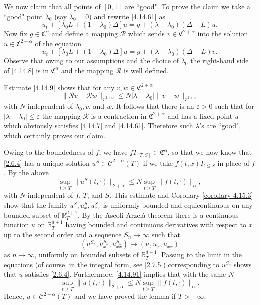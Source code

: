 \documentclass[reqno,12pt]{amsart}
\theoremstyle{definition}
\theoremstyle{remark}
\begin{document}
We now claim that all points of $[0,1]$ are ``good". To prove the
claim we take a ``good" point $\lambda_{0}$ (say $\lambda_{0}=0$)
and rewrite \eqref{4.14.61} as
\begin{equation}
                                                       \label{4.14.7}
u_{t}+[\lambda_{0} L+(1-\lambda_{0})\Delta] u=g
+(\lambda-\lambda_{0})(\Delta-L)u.
\end{equation}
Now fix $g\in {\mathfrak{C}}^{\alpha}$ and define a mapping ${\mathcal{R}}$ which sends
$v\in
{\mathfrak{C}}^{2+\alpha}$ into the solution $u\in {\mathfrak{C}}^{2+\alpha}$ of the
equation
\begin{equation}
                                                       \label{4.14.8}
u_{t}+[\lambda_{0} L+(1-\lambda_{0})\Delta] u=g
+(\lambda-\lambda_{0})(\Delta-L)v.
\end{equation}
Observe that owing to our assumptions and the choice of
$\lambda_{0}$ the right-hand side of \eqref{4.14.8} is in
${\mathfrak{C}}^{\alpha}$ and the mapping ${\mathcal{R}}$ is well defined.

Estimate \eqref{4.14.9} shows that for any $v,w\in{\mathfrak{C}}^{2+\alpha}$
$$
\|{\mathcal{R}} v-{\mathcal{R}} w\|_{{\mathfrak{C}}^{2+\alpha}}\leq N|\lambda-\lambda_{0}| \| v-
w\|_{{\mathfrak{C}}^{2+\alpha}}
$$
with $N$ independent of $\lambda_{0},v$, and $w$. It follows that
there is an $\varepsilon>0$ such that for
$|\lambda-\lambda_{0}|\leq\varepsilon$ the mapping ${\mathcal{R}}$ is a
contraction in ${\mathfrak{C}}^{2+\alpha}$ and has a fixed point $u$ which
obviously satisfies \eqref{4.14.7} and \eqref{4.14.61}. Therefore
such $\lambda$'s are ``good", which certainly proves our claim.

Owing to the boundedness of $f$, we have $fI_{[T,S]}\in
{\mathfrak{C}}^{\alpha}$, so that we now know that \eqref{2.6.4} has a
unique solution $u^{S} \in {\mathcal{C}}^{2+\alpha}(T)$ if we take
$f(t,x)I_{t\le S}$ in place of $f$. By the above
\begin{equation}
                                                       \label{4.14.91}
\sup_{t\geq T}\|u^{S}(t, \cdot )\|_{2+\alpha}  \leq N\sup_{t\geq
T}\|f(t,\cdot)\|_{\alpha},
\end{equation}
   with $N$ independent of $f$, $T$, and $S$. This estimate  and
Corollary \ref{corollary 4.15.3} show  that the family
$u^{S},u^{S}_{x},u^{S}_{xx}$ is uniformly bounded and
equicontinuous on any bounded subset of ${\mathbb{R}}^{d+1}_{T}$. By the
Ascoli-Arzel\`a theorem there is a continuous function $u$ on
${\mathbb{R}}^{d+1}_{T}$ having bounded and continuous derivatives 
with respect to $x$
up to
the second order and a sequence $S_{n}\to\infty$ such that
   $$
   (u^{S_{n}},u^{S_{n}}_{x},u^{S_{n}}_{xx}) \to(
u^{},u^{}_{x},u^{}_{xx})
$$
as $n \to \infty$,  uniformly on  bounded subsets of
${\mathbb{R}}^{d+1}_{T}$. Passing to the limit in the equations (of course,
in the integral form, see \eqref{2.7.5}) corresponding to
   $u^{S_n}$
shows that $u$ satisfies \eqref{2.6.4}. Furthermore,
\eqref{4.14.91} implies that with the same $N$
$$
\sup_{t\geq T}\|u(t,\cdot)\|_{2+\alpha} \leq N\sup_{t\geq
T}\|f(t,\cdot)\|_{\alpha}.
$$
Hence, $u\in {\mathcal{C}}^{2+\alpha}(T)$ and we have proved the lemma if
$T>-\infty$.
\end{document}
